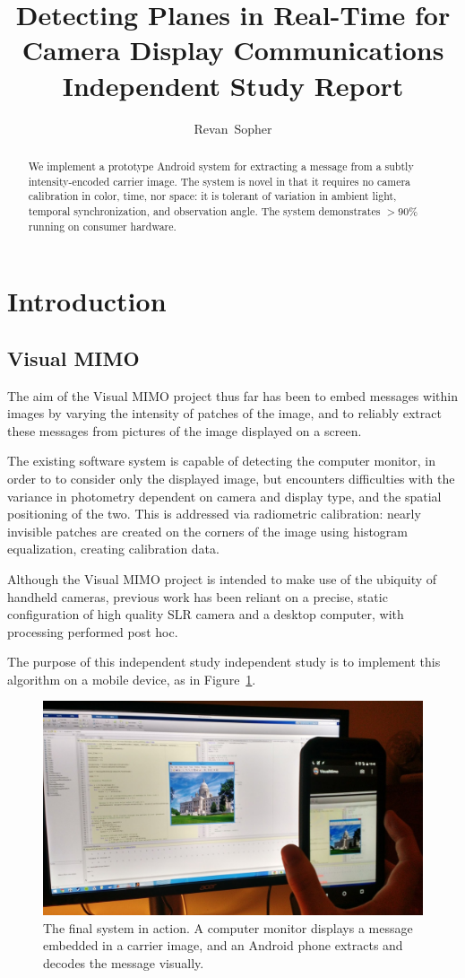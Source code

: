 \documentclass[11pt, letterpaper]{article}
\author{Revan~Sopher}
\title{Detecting Planes in Real-Time for Camera Display Communications\\
{\large Independent Study Report}}
\begin{document}
\maketitle

\begin{abstract}
We implement a prototype Android system for extracting a message from a subtly intensity-encoded carrier image.
The system is novel in that it requires no camera calibration in color, time, nor space: it is tolerant of variation in ambient light, temporal synchronization, and observation angle. The system demonstrates $>90 \%$ running on consumer hardware.
\end{abstract}

\section{Introduction}

\subsection{Visual MIMO}
The aim of the Visual MIMO project thus far has been to embed messages within images by varying the intensity of patches of the image, and to reliably extract these messages from pictures of the image displayed on a screen.

The existing software system is capable of detecting the computer monitor, in order to to consider only the displayed image, but encounters difficulties with the variance in photometry dependent on camera and display type, and the spatial positioning of the two.
This is addressed via radiometric calibration: nearly invisible patches are created on the corners of the image using histogram equalization, creating calibration data.

Although the Visual MIMO project is intended to make use of the ubiquity of handheld cameras, previous work has been reliant on a precise, static configuration of high quality SLR camera and a desktop computer, with processing performed post hoc.

The purpose of this independent study independent study is to implement this algorithm on a mobile device, as in Figure~\ref{fig:system}.

\begin{figure}[hbtp]
\centering
\includegraphics[width=0.5 \textwidth]{img/system.jpg}
\caption{The final system in action. A computer monitor displays a message embedded in a carrier image, and an Android phone extracts and decodes the message visually.}
\label{fig:system}
\end{figure}
\end{document}
